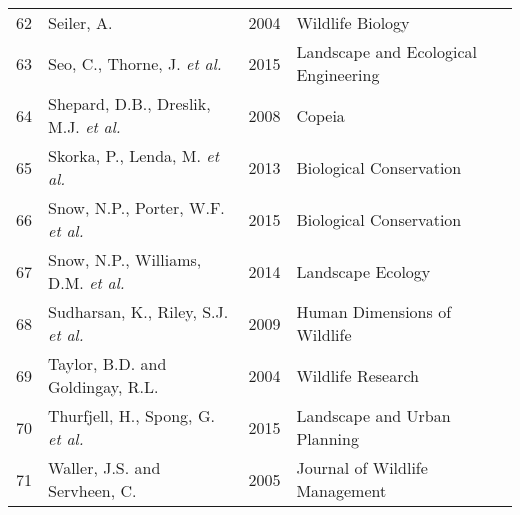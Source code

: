 \begin{longtable}[c]{@{}p{.75cm}p{6cm}p{1.25cm}p{5.5cm}@{}}
   62 & Seiler, A. & 2004 & Wildlife Biology \\ 
   63 & Seo, C., Thorne, J. \textit{et al.} & 2015 & Landscape and Ecological Engineering \\ 
   64 & Shepard, D.B., Dreslik, M.J. \textit{et al.} & 2008 & Copeia \\ 
   65 & Skorka, P., Lenda, M. \textit{et al.} & 2013 & Biological Conservation  \\ 
   66 & Snow, N.P., Porter, W.F. \textit{et al.} & 2015 & Biological Conservation  \\ 
   67 & Snow, N.P., Williams, D.M. \textit{et al.} & 2014 & Landscape Ecology \\ 
   68 & Sudharsan, K., Riley, S.J. \textit{et al.} & 2009 & Human Dimensions of Wildlife \\ 
   69 & Taylor, B.D. and Goldingay, R.L. & 2004 & Wildlife Research \\ 
   70 & Thurfjell, H., Spong, G. \textit{et al.} & 2015 & Landscape and Urban Planning  \\ 
   71 & Waller, J.S. and Servheen, C. & 2005 & Journal of Wildlife Management \\
   \hline
\end{longtable}


%